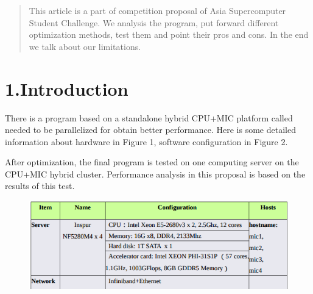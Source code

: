 \documentclass{article}
\begin{document}
\mdxtitleblockstart{}
\mdxauthorstart{}
\mdxauthorend\mdtitleauthorrunning{}{}\mdxtitleblockend%

\begin{abstract}%

\noindent{}This article is a part of competition proposal of Asia Supercomputer Student Challenge. We analysis the  program, put forward different optimization methods, test them and point their pros and cons. In the end we talk about our limitations.%
\end{abstract}%

\section{1.\hspace*{0.5em}Introduction}\label{sec-introduction}%

\noindent{}There is a program based on a standalone hybrid CPU+MIC platform called  needed to be parallelized for obtain better performance. Here is some detailed information about hardware in Figure 1, software configuration in Figure 2.%

After optimization, the final program is tested on one computing server on the CPU+MIC hybrid cluster. Performance analysis in this proposal is based on the results of this test.%

\begin{figure}[tbp]%
\begin{mdcenter}%

\noindent{}\includegraphics[keepaspectratio=true,width=\dimmin{}{\dimwidth{0.90}}]{images/2016-02-18-23-01-13-}{}%

\mdhr{}%

\noindent{}%
\end{mdcenter}\label{fig-myfigure}%
\end{figure}%
\end{document}
